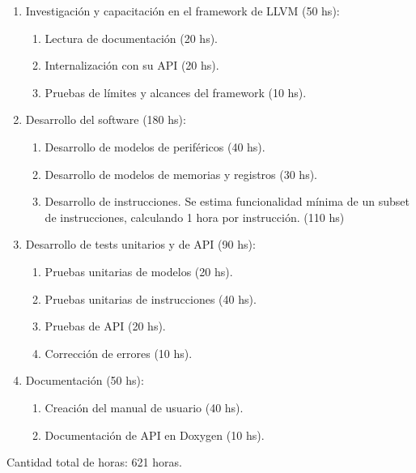 \begin{enumerate}
\item Investigación y capacitación en el framework de LLVM (50 hs):

  \begin{enumerate}
  \item Lectura de documentación (20 hs).
  \item Internalización con su API (20 hs).
  \item Pruebas de límites y alcances del framework (10 hs).
  \end{enumerate}

\item Desarrollo del software (180 hs):

  \begin{enumerate}
  \item Desarrollo de modelos de periféricos (40 hs).
  \item Desarrollo de modelos de memorias y registros (30 hs).
  \item Desarrollo de instrucciones. Se estima funcionalidad mínima de un subset de instrucciones, calculando 1 hora por instrucción. (110 hs)
  \end{enumerate}


\item Desarrollo de tests unitarios y de API (90 hs):

  \begin{enumerate}
  \item Pruebas unitarias de modelos (20 hs).
  \item Pruebas unitarias de instrucciones (40 hs).
  \item Pruebas de API (20 hs).
  \item Corrección de errores (10 hs).
  \end{enumerate}


\item Documentación (50 hs):

\begin{enumerate}
\item Creación del manual de usuario (40 hs).
\item Documentación de API en Doxygen (10 hs).
\end{enumerate}

\end{enumerate}


Cantidad total de horas: 621 horas.
